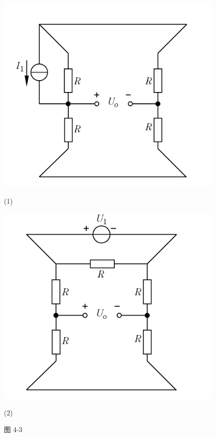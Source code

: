 \documentclass[hyperref, UTF8]{ctexart}
\begin{document}
\begin{figure}[!htb]
\centering
\begin{minipage}[t]{0.343\textwidth}
\centering
\includegraphics[width=1\textwidth]{p4-3-sol1.png}
\caption*{(1)}
\end{minipage}
\begin{minipage}[t]{0.337\textwidth}
\centering
\includegraphics[width=1\textwidth]{p4-3-sol2.png}
\caption*{(2)}
\end{minipage}
\caption*{图 4-3}
\end{figure}
\end{document}
